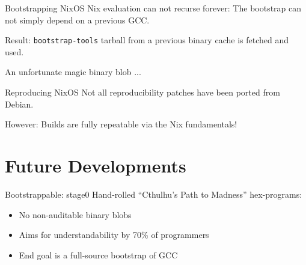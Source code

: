 \documentclass[12pt]{beamer}
\begin{document}

  \begin{frame}{Bootstrapping NixOS}
    Nix evaluation can not recurse forever: The bootstrap can not
    simply depend on a previous GCC.

    Result: \texttt{bootstrap-tools} tarball from a previous binary
    cache is fetched and used.

    An unfortunate magic binary blob ...
  \end{frame}

  \begin{frame}{Reproducing NixOS}
    Not all reproducibility patches have been ported from Debian.

    However: Builds are fully repeatable via the Nix fundamentals!
  \end{frame}

  \section{Future Developments}

  \begin{frame}{Bootstrappable: stage0}
    Hand-rolled ``Cthulhu's Path to Madness'' hex-programs:

    \begin{itemize}
    \item No non-auditable binary blobs
    \item Aims for understandability by 70\% of programmers
    \item End goal is a full-source bootstrap of GCC
    \end{itemize}
  \end{frame}
\end{document}
